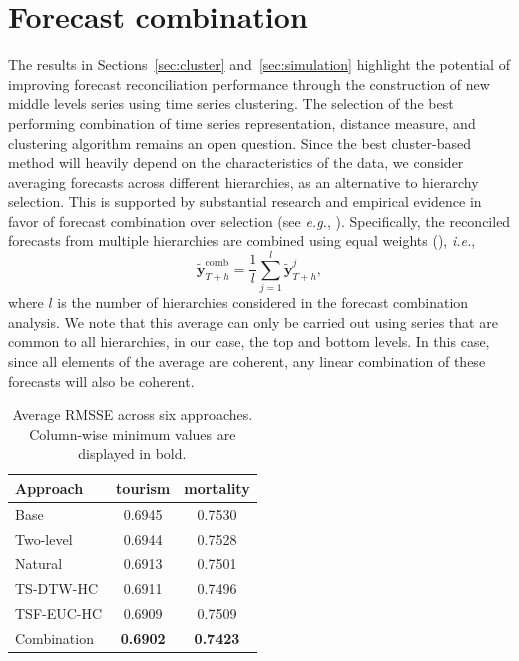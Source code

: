 \documentclass[a4paper,review,12pt,authoryear]{elsarticle}
\begin{document}
\section{Forecast combination}
\label{sec:combination}

The results in Sections~\ref{sec:cluster} and~\ref{sec:simulation} highlight the potential of improving forecast reconciliation performance through the construction of new middle levels series using time series clustering. The selection of the best performing combination of time series representation, distance measure, and clustering algorithm remains an open question. Since the best cluster-based method will heavily depend on the characteristics of the data, %
we consider averaging forecasts across different hierarchies, as an alternative to hierarchy selection. This is supported by substantial research and empirical evidence in favor of forecast combination over selection (see \textit{e.g.}, \citealp{elliottForecastingEconomicsFinance2016}). Specifically, the reconciled forecasts from multiple hierarchies are combined using equal weights (\citealp{wangForecastCombinations50year2022}), \textit{i.e.},
\[
  \tilde{\boldsymbol{y}}_{T+h}^{\text{comb}} = \frac{1}{l} \sum_{j=1}^l \tilde{\boldsymbol{y}}_{T+h}^j,
\] 
{where $l$ is the number of hierarchies considered in the forecast combination analysis.}
We note that this average can only be carried out using series that are common to all hierarchies, in our case, the top and bottom levels. In this case, since all elements of the average are coherent, any linear combination of these forecasts will also be coherent. \\



\begin{table}[h!]
    \centering
    \caption{\label{tab:P4_RMSSE}Average RMSSE across six approaches. Column-wise minimum values are displayed in bold.}
    \begin{tabular}{lcc}\toprule
       Approach & tourism & mortality \\ \midrule
        Base & 0.6945 & 0.7530 \\ 
        Two-level & 0.6944 & 0.7528 \\ 
        Natural & 0.6913 & 0.7501 \\ 
        TS-DTW-HC & 0.6911 & 0.7496 \\ 
        TSF-EUC-HC & 0.6909 & 0.7509 \\ 
        Combination & \textbf{0.6902} & \textbf{0.7423} \\ \bottomrule
    \end{tabular}
\end{table}
\end{document}
